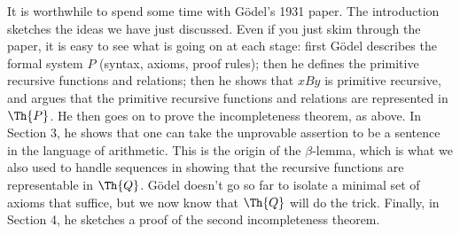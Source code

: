 \documentclass[../../../include/open-logic-section]{subfiles}
\begin{document}

It is worthwhile to spend some time with G\"odel's 1931
paper. The introduction sketches the ideas we have just discussed.
Even if you just skim through the paper, it is easy to see what is
going on at each stage: first G\"odel describes the formal system $P$
(syntax, axioms, proof rules); then he defines the primitive recursive
functions and relations; then he shows that $x B y$ is primitive
recursive, and argues that the primitive recursive functions and
relations are represented in $\Th{P}$. He then goes on to prove the
incompleteness theorem, as above. In Section 3, he shows that one can
take the unprovable assertion to be a sentence in the language of
arithmetic. This is the origin of the $\beta$-lemma, which is what we
also used to handle sequences in showing that the recursive functions
are representable in $\Th{Q}$. G\"odel doesn't go so far to isolate a
minimal set of axioms that suffice, but we now know that $\Th{Q}$ will do
the trick.  Finally, in Section 4, he sketches a proof of the second
incompleteness theorem.
\end{document}
